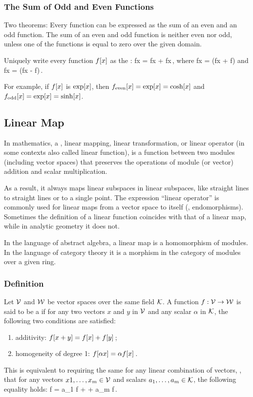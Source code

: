\subsubsection{The Sum of Odd and Even Functions}
Two theorems: Every function can be expressed as the sum of an even and an odd function. The sum of an even and odd function is neither even nor odd, unless one of the functions is equal to zero over the given domain.

Uniquely write every function $f\!\left[{x}\right]$ as the :
\beq
f\vat x = f\vat x + f\vat x\,,
\eeq
where
\beq
f\vat x = \left(f\vat x + f\right)
\eeq
and
\beq
f\vat x = \left(f\vat x - f\right)\,.\mqed
\eeq

For example, if $f\!\left[{x}\right]$ is $\exp\!\left[{x}\right]$, then $f_\text{even}\!\left[{x}\right] = \exp\!\left[{x}\right] = \cosh\!\left[{x}\right]$ and $f_\text{odd}\!\left[{x}\right] = \exp\!\left[{x}\right] = \sinh\!\left[{x}\right]$.


\subsection{Linear Map}
In mathematics, a , \aka linear mapping, linear transformation, or linear operator (in some contexts also called linear function), is a function between two modules (including vector spaces) that preserves the operations of module (or vector) addition and scalar multiplication.

As a result, it always maps linear subspaces in linear subspaces, like straight lines to straight lines or to a single point. The expression ``linear operator'' is commonly used for linear maps from a vector space to itself (\ie, endomorphisms). Sometimes the definition of a linear function coincides with that of a linear map, while in analytic geometry it does not.

In the language of abstract algebra, a linear map is a homomorphism of modules. In the language of category theory it is a morphism in the category of modules over a given ring.


\subsubsection{Definition}
Let $\mathcal{V}$ and $\mathcal{W}$ be vector spaces over the same field $\mathcal{K}$. A function ${f}:{\mathcal{V}}\to{\mathcal{W}}$ is said to be a  if for any two vectors $x$ and $y$ in $\mathcal{V}$ and any scalar $\alpha$ in $\mathcal{K}$, the following two conditions are satisfied:
\begin{enumerate}
\item additivity: $f\!\left[{x + y}\right] = f\!\left[{x}\right] + f\!\left[{y}\right]$\,;
\item homogeneity of degree 1: $f\!\left[{\alpha x}\right] = \alpha f\!\left[{x}\right]$\,.
\end{enumerate}
This is equivalent to requiring the same for any linear combination of vectors, \ie, that for any vectors $x1,\dotsc,x_m\in\mathcal{V}$ and scalars $a_1,\dotsc, a_m\in\mathcal{K}$, the following equality holds:
\beq
f = a_1 f + \dotsb + a_m f\,.
\eeq


